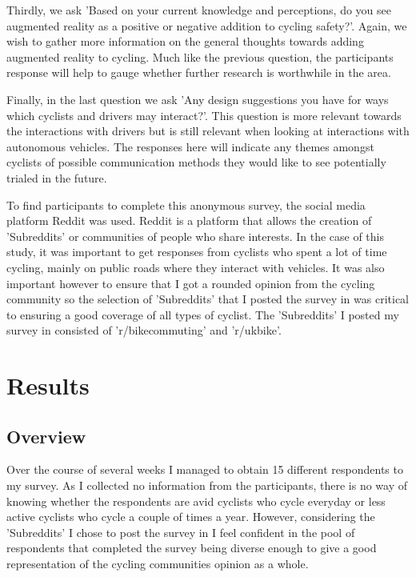 \documentclass{l4proj}
\begin{document}
Thirdly, we ask 'Based on your current knowledge and perceptions, do you see augmented reality as a positive or negative addition to cycling safety?'. Again, we wish to gather more information on the general thoughts towards adding augmented reality to cycling. Much like the previous question, the participants response will help to gauge whether further research is worthwhile in the area.

Finally, in the last question we ask 'Any design suggestions you have for ways which cyclists and drivers may interact?'. This question is more relevant towards the interactions with drivers but is still relevant when looking at interactions with autonomous vehicles. The responses here will indicate any themes amongst cyclists of possible communication methods they would like to see potentially trialed in the future.

To find participants to complete this anonymous survey, the social media platform Reddit was used. Reddit is a platform that allows the creation of 'Subreddits' or communities of people who share interests. In the case of this study, it was important to get responses from cyclists who spent a lot of time cycling, mainly on public roads where they interact with vehicles. It was also important however to ensure that I got a rounded opinion from the cycling community so the selection of 'Subreddits' that I posted the survey in was critical to ensuring a good coverage of all types of cyclist. The 'Subreddits' I posted my survey in consisted of 'r/bikecommuting' and 'r/ukbike'.

\section{Results}

\subsection{Overview}

Over the course of several weeks I managed to obtain 15 different respondents to my survey. As I collected no information from the participants, there is no way of knowing whether the respondents are avid cyclists who cycle everyday or less active cyclists who cycle a couple of times a year. However, considering the 'Subreddits' I chose to post the survey in I feel confident in the pool of respondents that completed the survey being diverse enough to give a good representation of the cycling communities opinion as a whole.
\end{document}
